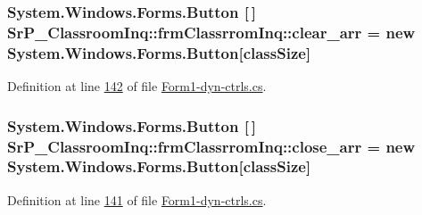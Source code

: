 \hypertarget{class_sr_p___classroom_inq_1_1frm_classrrom_inq_a1c427c3d5bb61c96ca798e5f6aaff8f4}{
\subsubsection[{clear\-\_\-arr}]{\setlength{\rightskip}{0pt plus 5cm}\-System.\-Windows.\-Forms.\-Button \mbox{[}$\,$\mbox{]} {\bf \-Sr\-P\-\_\-\-Classroom\-Inq\-::frm\-Classrrom\-Inq\-::clear\-\_\-arr} = new \-System.\-Windows.\-Forms.\-Button\mbox{[}{\bf class\-Size}\mbox{]}}}
\label{class_sr_p___classroom_inq_1_1frm_classrrom_inq_a1c427c3d5bb61c96ca798e5f6aaff8f4}


\-Definition at line \hyperlink{_form1-dyn-ctrls_8cs_source_l00142}{142} of file \hyperlink{_form1-dyn-ctrls_8cs_source}{\-Form1-\/dyn-\/ctrls.\-cs}.

\hypertarget{class_sr_p___classroom_inq_1_1frm_classrrom_inq_a4758f35d344b79b972e88a42cb660904}{
\subsubsection[{close\-\_\-arr}]{\setlength{\rightskip}{0pt plus 5cm}\-System.\-Windows.\-Forms.\-Button \mbox{[}$\,$\mbox{]} {\bf \-Sr\-P\-\_\-\-Classroom\-Inq\-::frm\-Classrrom\-Inq\-::close\-\_\-arr} = new \-System.\-Windows.\-Forms.\-Button\mbox{[}{\bf class\-Size}\mbox{]}}}
\label{class_sr_p___classroom_inq_1_1frm_classrrom_inq_a4758f35d344b79b972e88a42cb660904}


\-Definition at line \hyperlink{_form1-dyn-ctrls_8cs_source_l00141}{141} of file \hyperlink{_form1-dyn-ctrls_8cs_source}{\-Form1-\/dyn-\/ctrls.\-cs}.

